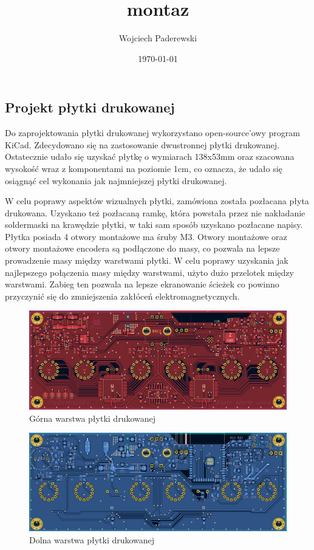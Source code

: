 \documentclass[../main.tex]{subfiles}
\author{Wojciech Paderewski}
\date{\today}
\title{montaz}
\begin{document}
\subsection{Projekt płytki drukowanej}
Do zaprojektowania płytki drukowanej wykorzystano open-source'owy program KiCad. Zdecydowano się na zastosowanie dwustronnej płytki drukowanej.
Ostatecznie udało się uzyskać płytkę o wymiarach 138x53mm oraz szacowana wysokość wraz z komponentami na poziomie 1cm, 
co oznacza, że udało się osiągnąć cel wykonania jak najmniejszej płytki drukowanej.

W celu poprawy aspektów wizualnych płytki, zamówiona została pozłacana płyta drukowana. Uzyskano też pozłacaną ramkę, która powstała przez 
nie nakładanie soldermaski na krawędzie płytki, w taki sam sposób uzyskano pozłacane napisy. Płytka posiada 4 otwory montażowe ma śruby M3.
Otwory montażowe oraz otwory montażowe encodera są podłączone do masy, co pozwala na lepsze prowadzenie masy między warstwami płytki. W 
celu poprawy uzyskania jak najlepszego połączenia masy między warstwami, użyto dużo przelotek między warstwami. Zabieg ten pozwala na
lepsze ekranowanie ścieżek co powinno przyczynić się do zmniejszenia zakłóceń elektromagnetycznych. 

\begin{figure}[H]
    \centering
    \includegraphics[width=1\textwidth]{TOP.png}
    \caption{Górna warstwa płytki drukowanej}
\end{figure}

\begin{figure}[H]
    \centering
    \includegraphics[width=1\textwidth]{BOTTOM.png}
    \caption{Dolna warstwa płytki drukowanej}
\end{figure}
\end{document}
